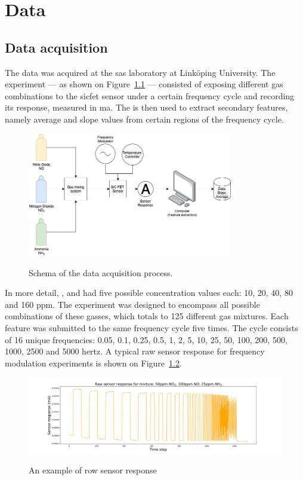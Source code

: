 \chapter{Data}
\label{cha:data}

\section{Data acquisition}
\label{sec:data-acquisition}

The data was acquired at the \acrfull{sas} laboratory at Linköping University. The experiment --- as shown on Figure~\ref{fig:experimental-setup} --- consisted of exposing different gas combinations to the \acrshort{sicfet} sensor under a certain frequency cycle and recording its response, measured in \acrfull{ma}. The is then used to extract secondary features, namely average and slope values from certain regions of the frequency cycle.

\begin{figure}[!htb]
	\centering
	\includegraphics[width=0.8\textwidth]{../figures/experimental-setup.png}
	\label{fig:experimental-setup}
	\caption{Schema of the data acquisition process.}
\end{figure}

In more detail, ,  and  had five possible concentration values each: 10, 20, 40, 80 and 160 \acrfull{ppm}. The experiment was designed to encompass all possible combinations of these gasses, which totals to 125 different gas mixtures. Each feature was submitted to the same frequency cycle five times. The cycle consists of 16 unique frequencies: 0.05, 0.1, 0.25, 0.5, 1, 2, 5, 10, 25, 50, 100, 200, 500, 1000, 2500 and 5000 \acrfull{hertz}. A typical raw sensor response for frequency modulation experiments is shown on Figure~\ref{fig:raw}.

\begin{figure}[!htb]
	\centering
	\includegraphics[width=1\textwidth]{../figures/raw-response.png}
	\label{fig:raw}
	\caption{An example of row sensor response}
\end{figure}

